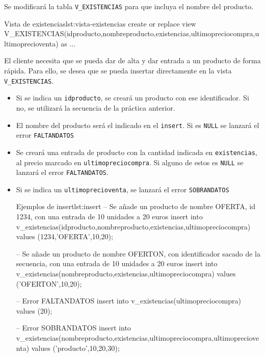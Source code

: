 \begin{homeworkProblem}

  Se modificará la tabla \texttt{V\_EXISTENCIAS} para que incluya el nombre del producto.

\begin{listadosql}{Vista de existencias}{lst:vista-existencias}
create or replace view V_EXISTENCIAS(idproducto,nombreproducto,existencias,ultimopreciocompra,ultimoprecioventa) as
...
\end{listadosql}  

  
  El cliente necesita que se pueda dar de alta y dar entrada a un producto de forma rápida. Para ello, se desea que se pueda insertar directamente en la vista \texttt{V\_EXISTENCIAS}.
  \begin{itemize}
  \item Si se indica un \texttt{idproducto}, se creará un producto con ese identificador. Si no, se utilizará la secuencia de la práctica anterior.
  \item El nombre del producto será el indicado en el \texttt{insert}. Si es \texttt{NULL} se lanzará el error \texttt{FALTANDATOS}
  \item Se creará una entrada de producto con la cantidad indicada en \texttt{existencias}, al precio marcado en \texttt{ultimopreciocompra}. Si alguno de estos es \texttt{NULL} se lanzará el error \texttt{FALTANDATOS}.
  \item Si se indica un \texttt{ultimoprecioventa}, se lanzará el error \texttt{SOBRANDATOS}

\begin{listadosql}{Ejemplos de insert}{lst:insert}
-- Se añade un producto de nombre OFERTA, id 1234, con una entrada de 10 unidades a 20 euros
insert into v_existencias(idproducto,nombreproducto,existencias,ultimopreciocompra) 
values (1234,'OFERTA',10,20);

-- Se añade un producto de nombre OFERTON, con identificador sacado de la secuencia, con una entrada de 10 unidades a 20 euros
insert into v_existencias(nombreproducto,existencias,ultimopreciocompra) 
values ('OFERTON',10,20);

-- Error FALTANDATOS
insert into v_existencias(ultimopreciocompra) values (20);

-- Error SOBRANDATOS
insert into v_existencias(nombreproducto,existencias,ultimopreciocompra,ultimoprecioventa) 
values ('producto',10,20,30);


\end{listadosql}
  \end{itemize}

\end{homeworkProblem}



